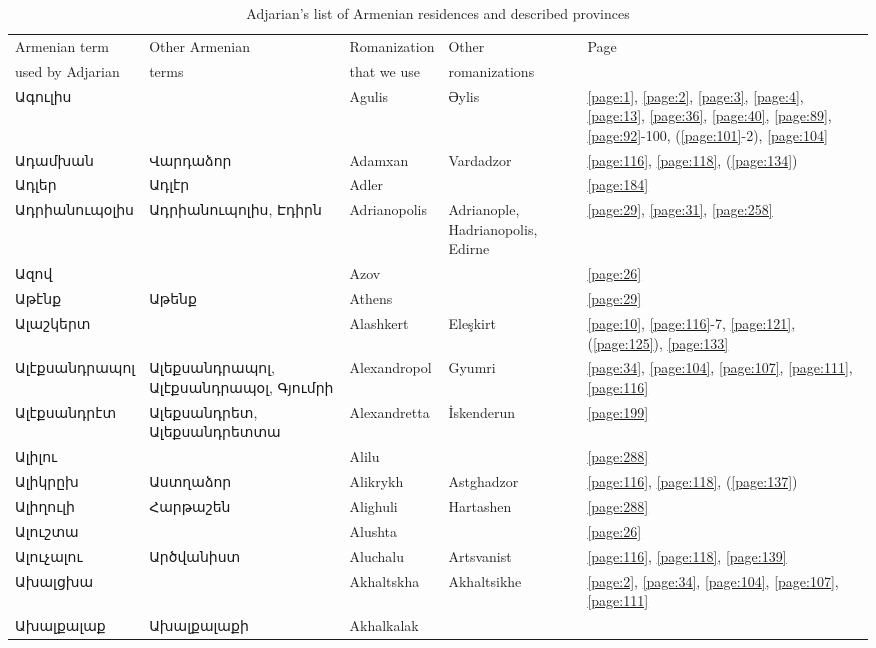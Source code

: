 \begin{center}
\begin{longtable}{|p{}|p{3cm}|p{3cm}|p{2cm}|p{3cm}|}
\caption{Adjarian's  list of Armenian residences and described provinces} \label{tab:long} \\ \hline
\hline Armenian term & Other Armenian  & Romanization   & Other   & Page \\ 
used by Adjarian  & terms&   that we use&romanizations & 
\\ \hline\hline
Ագուլիս & & 
{Agulis}   &Əylis &\ref{page:1}, \ref{page:2}, \ref{page:3}, \ref{page:4}, \ref{page:13}, \ref{page:36}, \ref{page:40}, \ref{page:89}, \ref{page:92}-100, (\ref{page:101}-2), \ref{page:104}\\ \hline
Ադամխան&  Վարդաձոր & 
{Adamxan} & Vardadzor
&\ref{page:116}, \ref{page:118}, (\ref{page:134})\\ \hline
Ադլեր&Ադլէր & 
{Adler}& &\ref{page:184}\\ \hline
Ադրիանուպօլիս&Ադրիանուպոլիս, Էդիրն
& {Adrianopolis}  & Adrianople,  Hadrianopolis, Edirne &\ref{page:29}, \ref{page:31}, \ref{page:258}\\ \hline
Ազով& &
{Azov}& &\ref{page:26}\\ \hline
Աթէնք& Աթենք&
{Athens}& &\ref{page:29}\\ \hline
Ալաշկերտ& &
{Alashkert}& Eleşkirt&\ref{page:10}, \ref{page:116}-7, \ref{page:121}, (\ref{page:125}), \ref{page:133}\\ \hline
Ալէքսանդրապոլ&Ալեքսանդրապոլ,  Ալէքսանդրապօլ,  Գյումրի
&{Alexandropol} & Gyumri&\ref{page:34}, \ref{page:104}, \ref{page:107}, \ref{page:111}, \ref{page:116}\\ \hline
Ալէքսանդրէտ&Ալեքսանդրետ, Ալեքսանդրետտա &
{Alexandretta}& İskenderun&\ref{page:199}\\ \hline
Ալիլու& 
&{Alilu}& &\ref{page:288}\\ \hline
Ալիկրըխ&Աստղաձոր &
{Alikrykh}&Astghadzor &\ref{page:116}, \ref{page:118}, (\ref{page:137})\\ \hline
Ալիղուլի& Հարթաշեն
& {Alighuli}& Hartashen&\ref{page:288}\\ \hline
Ալուշտա& &
{Alushta}& &\ref{page:26}\\ \hline
Ալուչալու&    Արծվանիստ 
&{Aluchalu} &Artsvanist &\ref{page:116}, \ref{page:118}, \ref{page:139}\\ \hline
Ախալցխա& 
&Akhaltskha   &Akhaltsikhe &\ref{page:2}, \ref{page:34}, \ref{page:104}, \ref{page:107}, \ref{page:111}\\ \hline
Ախալքալաք&Ախալքալաքի &  Akhalkalak 

\end{longtable}
\end{center}
